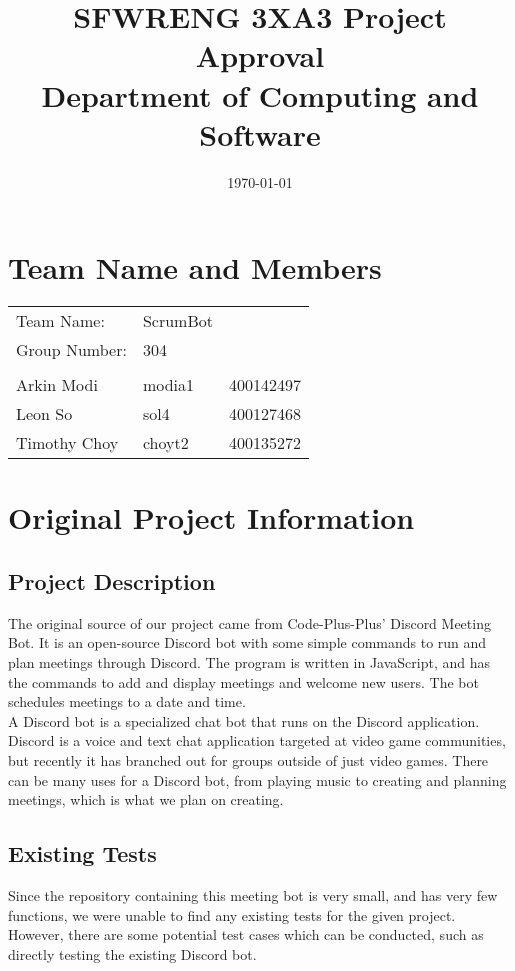\documentclass[12pt]{article}
\title{
    SFWRENG 3XA3 Project Approval\\
    \large Department of Computing and Software\\
}
\author{}
\date{\today}
\begin{document}
\maketitle

\section{Team Name and Members}

\begin{tabular}{l l l}
    Team Name: & ScrumBot\\
    Group Number: & 304 \\
    \\
    Arkin Modi & modia1 & 400142497 \\
    Leon So & sol4 & 400127468 \\
    Timothy Choy & choyt2 & 400135272
\end{tabular}

\section{Original Project Information}
\subsection{Project Description}
The original source of our project came from Code-Plus-Plus' Discord Meeting Bot. It is an open-source Discord bot with some simple commands to run and plan meetings through Discord. The program is written in JavaScript, and has the commands to add and display meetings and welcome new users. The bot schedules meetings to a date and time.\\
A Discord bot is a specialized chat bot that runs on the Discord application. Discord is a voice and text chat application targeted at video game communities, but recently it has branched out for groups outside of just video games. There can be many uses for a Discord bot, from playing music to creating and planning meetings, which is what we plan on creating.

\subsection{Existing Tests}
Since the repository containing this meeting bot is very small, and has very few functions, we were unable to find any existing tests for the given project. However, there are some potential test cases which can be conducted, such as directly testing the existing Discord bot.
\end{document}

